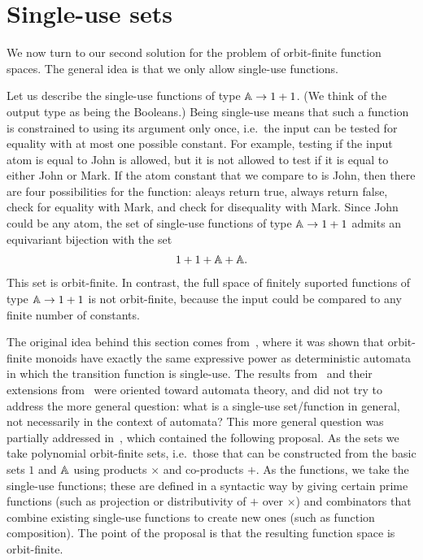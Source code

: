 \section{Single-use sets}
\label{sec:single-use-sets}
We now turn to our second solution for the problem of orbit-finite function spaces.  The general idea is that we only allow single-use functions. 

\begin{example}\label{ex:first-single-use-function-space}
    Let us describe the single-use functions of type $\mathbb A \to 1 + 1$. (We think of the output type as being the Booleans.) Being single-use means that such a function is constrained to using its argument only once, i.e.~the input can be tested for equality with at most one possible constant. For example, testing if the input atom is equal to John is allowed, but it is not allowed to test if it is equal to either John or Mark.  If the atom constant that we compare to is John, then there are four possibilities for the function:  aleays return true, always return false, check for equality with Mark, and check for disequality with Mark. Since John could be any atom,  the set of single-use functions of type $\mathbb A \to 1+1$ admits an equivariant bijection with the set 
    \begin{align}\label{eq:bad-solution-for-function-space}
        1 + 1 + \mathbb A + \mathbb A.
    \end{align}
This set is orbit-finite.  In contrast, the full space of finitely suported functions  of type $\mathbb A \to 1 + 1$ is not orbit-finite, because the input could be compared to any finite number of constants.
\end{example}


The original idea behind this section comes from~\cite[Section 3]{stefansk-msc}, where it was shown that orbit-finite monoids have exactly the same expressive power as deterministic automata in which the transition function is single-use.  The results from~\cite{stefansk-msc} and their extensions from~\cite{bojanczykstefanski2020} were oriented toward automata theory, and did not try to address the more general question: what is a single-use set/function in general, not necessarily in the context of automata?  This more general question was partially addressed in~\cite[Section 2.2]{stefanski-phd}, which contained the following proposal. As the sets we take polynomial orbit-finite sets, i.e.~those that can be constructed from the basic sets $1$ and $\mathbb A$ using products $\times$ and co-products $+$. As the functions, we take the single-use functions; these are defined in a syntactic way by giving certain prime functions (such as projection or distributivity of $+$ over $\times$) and combinators that combine existing single-use functions to create new ones (such as function composition). The point of the proposal is that the resulting function space is orbit-finite. 


